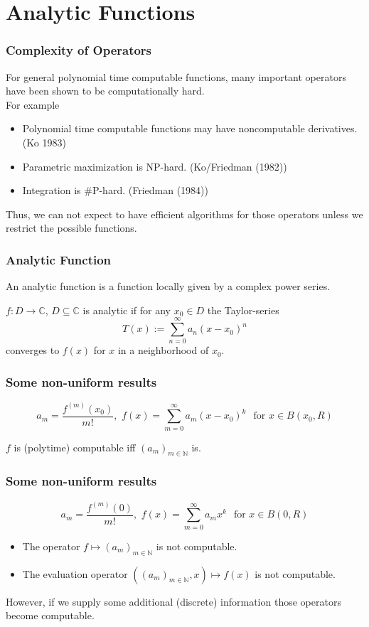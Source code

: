 \documentclass[xcolor=pdftex,dvipsnames,table]{beamer}
\newcommand{\N}{\ensuremath{\mathbb{N}}}
\newcommand{\C}{\ensuremath{\mathbb{C}}}
\begin{document}
\section{Analytic Functions}
\begin{frame}
\frametitle{Complexity of Operators}
\begin{fact}
For general polynomial time computable functions, many important operators have been shown to be computationally hard.\\
For example
\pause
\begin{itemize}[<+->]
\item Polynomial time computable functions may have noncomputable derivatives. (Ko 1983)
\item Parametric maximization is NP-hard. (Ko/Friedman (1982))
\item Integration is \#P-hard. (Friedman (1984))
\end{itemize}
\end{fact}
\pause
Thus, we can not expect to have efficient algorithms for those operators unless we restrict the possible functions.
\end{frame}
\begin{frame}
\frametitle{Analytic Function}
An analytic function is a function locally given by a complex power series.\\
\begin{definition}
$f : D \to \C $, $D \subseteq \C$ is analytic if for any $x_0 \in D$ the Taylor-series
$$ T(x) := \sum^\infty_{n=0} a_n(x-x_0)^n$$
converges to $f(x)$ for $x$ in a neighborhood of $x_0$.  
\end{definition}
\end{frame}
\begin{frame}
\frametitle{Some non-uniform results}

$$a_m =\frac{f^{(m)}(x_0)}{m!} 
, \,\, f(x) = \sum_{m=0}^\infty a_m(x-x_0)^k \,\ \text{ for } x \in B(x_0,R)
$$
\vfill
\begin{theorem}
$f$ is (polytime) computable iff $(a_m)_{m \in \N}$ is.
\end{theorem}
\end{frame}
\begin{frame}
\frametitle{Some non-uniform results}
$$a_m =\frac{f^{(m)}(0)}{m!} 
, \,\, f(x) = \sum_{m=0}^\infty a_mx^k \,\ \text{ for } x \in B(0,R)
$$
\vfill
\begin{theorem}[M\"uller (1995)]
\begin{itemize}
\item The operator $f \mapsto (a_m)_{m \in \N}$ is not computable.
\item The evaluation operator $((a_m)_{m \in \N},x) \mapsto f(x) $ is not computable.
\end{itemize}
\end{theorem}
\pause
However, if we supply some additional (discrete) information those operators become computable.
\end{frame}
\end{document}
